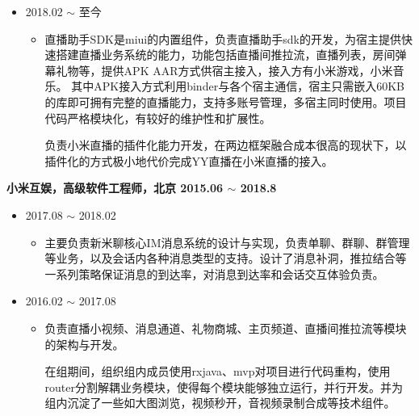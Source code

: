 \documentclass[line,margin,UTF8]{res}
\begin{document}
\begin{resume}
  \begin{itemize}
 \item {} 2018.02 $\sim$ 至今
 	\vspace{-3pt}
 	\begin{itemize}
 		\item 
 		直播助手SDK是miui的内置组件，负责直播助手sdk的开发，为宿主提供快速搭建直播业务系统的能力，功能包括直播间推拉流，直播列表，房间弹幕礼物等，提供APK AAR方式供宿主接入，接入方有小米游戏，小米音乐。
 		其中APK接入方式利用binder与各个宿主通信，宿主只需嵌入60KB的库即可拥有完整的直播能力，支持多账号管理，多宿主同时使用。项目代码严格模块化，有较好的维护性和扩展性。

 		负责小米直播的插件化能力开发，在两边框架融合成本很高的现状下，以插件化的方式极小地代价完成YY直播在小米直播的接入。
 \end{itemize}
 \end{itemize}


{\bf 小米互娱，高级软件工程师，北京 \hfill  2015.06 $\sim$ 2018.8}
 \vspace{3pt}

 \begin{itemize}
 \item {} 2017.08 $\sim$ 2018.02
 	\vspace{-3pt}
 	\begin{itemize}
 		\item 
 		主要负责新米聊核心IM消息系统的设计与实现，负责单聊、群聊、群管理等业务，以及会话内各种消息类型的支持。设计了消息补洞，推拉结合等一系列策略保证消息的到达率，对消息到达率和会话交互体验负责。

 \end{itemize}
 \end{itemize}

 \begin{itemize}
 \item {} 2016.02 $\sim$ 2017.08
 	\vspace{-3pt}
 	\begin{itemize}
 		\item 
 		负责直播小视频、消息通道、礼物商城、主页频道、直播间推拉流等模块的架构与开发。
 		
 		在组期间，组织组内成员使用rxjava、mvp对项目进行代码重构，使用router分割解耦业务模块，使得每个模块能够独立运行，并行开发。并为组内沉淀了一些如大图浏览，视频秒开，音视频录制合成等技术组件。



\end{itemize}
\end{itemize}
\end{resume}
\end{document}
